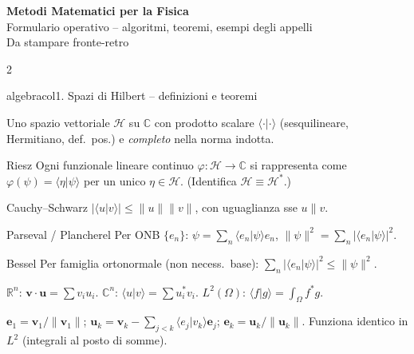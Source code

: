 \documentclass[10pt,a4paper]{article}
\newcommand{\R}{\mathbb{R}}
\newcommand{\C}{\mathbb{C}}
\newcommand{\braket}[2]{\langle#1|#2\rangle}
\begin{document}
\begin{center}
{\Large\bfseries\color{algebracol!80!black} Metodi Matematici per la Fisica}\\[2pt]
{\small Formulario operativo -- algoritmi, teoremi, esempi degli appelli}\\[1pt]
{\footnotesize Da stampare fronte-retro}
\end{center}
\vspace{-4pt}

\begin{multicols}{2}
\small

\begin{secbox}{algebracol}{1. Spazi di Hilbert -- definizioni e teoremi}

Uno spazio vettoriale $\mathcal H$ su $\C$ con prodotto scalare $\braket{\cdot}{\cdot}$ (sesquilineare, Hermitiano, def.\ pos.) e \emph{completo} nella norma indotta.

\begin{teobox}{Riesz}
Ogni funzionale lineare continuo $\varphi:\mathcal H\to\C$ si rappresenta come $\varphi(\psi)=\braket{\eta}{\psi}$ per un unico $\eta\in\mathcal H$. (Identifica $\mathcal H\equiv\mathcal H^*$.)
\end{teobox}

\begin{teobox}{Cauchy--Schwarz}
$|\braket{u}{v}|\le\|u\|\|v\|$, con uguaglianza sse $u\parallel v$.
\end{teobox}

\begin{teobox}{Parseval / Plancherel}
Per ONB $\{e_n\}$: $\psi=\sum_n\braket{e_n}{\psi}e_n$,\; $\|\psi\|^2=\sum_n|\braket{e_n}{\psi}|^2$.
\end{teobox}

\begin{teobox}{Bessel}
Per famiglia ortonormale (non necess.\ base): $\sum_n|\braket{e_n}{\psi}|^2\le\|\psi\|^2$.
\end{teobox}

$\R^n$: $\bm v\!\cdot\!\bm u=\sum v_iu_i$. \;$\C^n$: $\braket{u}{v}=\sum u_i^*v_i$. \;$L^2(\Omega)$: $\braket{f}{g}=\int_\Omega f^*g$.

$\bm e_1=\bm v_1/\|\bm v_1\|$; \; $\bm u_k=\bm v_k-\sum_{j<k}\braket{e_j}{v_k}\bm e_j$; \; $\bm e_k=\bm u_k/\|\bm u_k\|$. Funziona identico in $L^2$ (integrali al posto di somme).


\end{secbox}
\end{multicols}
\end{document}
